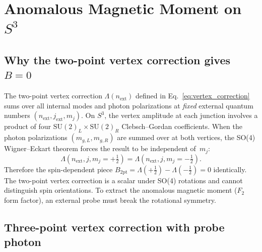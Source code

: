 \documentclass[11pt]{article}
\begin{document}
\section{Anomalous Magnetic Moment on $S^3$}
\label{sec:anomalous_moment}

\subsection{Why the two-point vertex correction gives $B = 0$}

The two-point vertex correction $\Lambda(n_{\mathrm{ext}})$ defined
in Eq.~\eqref{eq:vertex_correction} sums over all internal modes and
photon polarizations at \emph{fixed} external quantum numbers
$(n_{\mathrm{ext}}, j_{\mathrm{ext}}, m_j)$.  On $S^3$, the vertex
amplitude at each junction involves a product of four
$\mathrm{SU}(2)_L \times \mathrm{SU}(2)_R$ Clebsch--Gordan
coefficients.  When the photon polarizations $(m_{g,L}, m_{g,R})$ are
summed over at both vertices, the SO(4) Wigner--Eckart theorem forces
the result to be independent of~$m_j$:
\begin{equation}
  \Lambda(n_{\mathrm{ext}}, j, m_j = +\tfrac{1}{2})
  = \Lambda(n_{\mathrm{ext}}, j, m_j = -\tfrac{1}{2}).
  \label{eq:B_zero_two_point}
\end{equation}
Therefore the spin-dependent piece
$B_{\mathrm{2pt}} = \Lambda(+\tfrac{1}{2}) - \Lambda(-\tfrac{1}{2}) = 0$
identically.  The two-point vertex correction is a scalar under SO(4)
rotations and cannot distinguish spin orientations.  To extract the
anomalous magnetic moment ($F_2$ form factor), an external probe must
break the rotational symmetry.

\subsection{Three-point vertex correction with probe photon}
\end{document}
